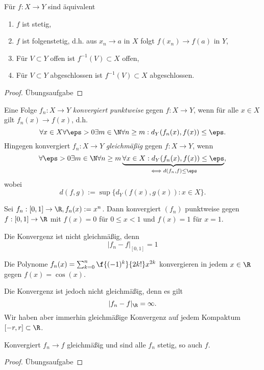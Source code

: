 \begin{st}
	Für $f: X \to Y$ sind äquivalent
	\begin{enumerate}[1)]
		\item
			$f$ ist stetig,
		\item
			$f$ ist folgenstetig, d.h. aus $x_n \to a$ in $X$ folgt $f(x_n) \to f(a)$ in $Y$,
		\item
			Für $V \subset Y$ offen ist $f^{-1}(V) \subset X$ offen,
		\item
			Für $V \subset Y$ abgeschlossen ist $f^{-1}(V) \subset X$ abgeschlossen.
	\end{enumerate}
	\begin{proof}
		Übungsaufgabe %
	\end{proof}
\end{st}

\begin{df}
	Eine Folge $f_n: X \to Y$ \emph{konvergiert punktweise} gegen $f: X \to Y$, wenn für alle $x \in X$ gilt $f_n(x) \to f(x)$, d.h.
	\[
		\forall x \in X \forall \eps > 0 \exists m \in \N \forall n \ge m : d_Y(f_n(x), f(x)) \le \eps.
	\]
	Hingegen konvergiert $f_n: X \to Y$ \emph{gleichmäßig} gegen $f: X \to Y$, wenn
	\[
		\forall \eps > 0 \exists m \in \N \forall n \ge m \underbrace{\forall x \in X : d_Y(f_n(x), f(x)) \le \eps}_{\iff d (f_n, f) \le \eps},
	\]
	wobei
	\[
		d(f,g)
		:= \sup \{ d_Y(f(x), g(x)) : x \in X \}.
	\]
\end{df}

\begin{ex}
	Sei $f_n : [0,1] \to \R, f_n(x) := x^n$.
	Dann konvergiert $(f_n)$ punktweise gegen $f:[0,1] \to \R$ mit $f(x) = 0$ für $0 \le x < 1$ und $f(x) = 1$ für $x=1$.

	Die Konvergenz ist nicht gleichmäßig, denn
	\[
		|f_n - f|_{[0,1]} = 1
	\]
\end{ex}

\begin{ex}
	Die Polynome $f_n(x) = \sum_{k=0}^n \f{(-1)^k}{2k!} x^{2k}$ konvergieren in jedem $x \in \R$ gegen $f(x) = \cos(x)$.

	Die Konvergenz ist jedoch nicht gleichmäßig, denn es gilt
	\[
		|f_n - f|_{\R} = \infty.
	\]
	Wir haben aber immerhin gleichmäßige Konvergenz auf jedem Kompaktum $[-r,r] \subset \R$.
\end{ex}

\begin{st}
	Konvergiert $f_n \to f$ gleichmäßig und sind alle $f_n$ stetig, so auch $f$.
	\begin{proof}
		Übungsaufgabe %
	\end{proof}
\end{st}

